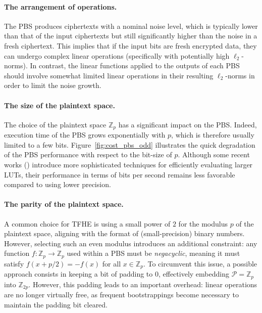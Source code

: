 \paragraph{The arrangement of operations.} The PBS produces ciphertexts with a nominal noise level, which is typically lower than that of the input ciphertexts but still significantly higher than the noise in a fresh ciphertext. This implies that if the input bits are fresh encrypted data, they can undergo complex linear operations (specifically with potentially high $\ell_2$-norms). In contrast, the linear functions applied to the outputs of each PBS should involve somewhat limited linear operations in their resulting  $\ell_2$-norms in order to limit the noise growth.

\paragraph{The size of the plaintext space.} The choice of the plaintext space $\mathbb{Z}_p$ has a significant impact on the PBS. Indeed, execution time of the PBS grows exponentially with $p$, which is therefore usually limited to a few bits.
\ifeprint Figure~\ref{fig:cost_pbs_odd} illustrates the quick degradation of the PBS performance with respect to the bit-size of $p$. \fi
Although some recent works (\cite{GBA21,AC:CLOT21,EPRINT:CZBSG22,KluSch24}) introduce more sophisticated techniques for efficiently evaluating larger LUTs, their performance in terms of bits per second remains less favorable compared to using lower precision. %

\paragraph{The parity of the plaintext space.} A common choice for TFHE is using a small power of $2$ for the modulus $p$ of the plaintext space, aligning with the format of (small-precision) binary numbers. However, selecting such an even modulus introduces an additional constraint: any function $f:\mathbb{Z}_p \to \mathbb{Z}_p$ used within a PBS must be \emph{negacyclic}, meaning it must satisfy $f(x + p/2) = - f(x)$ for all $x \in \mathbb{Z}_p$. To circumvent this issue, a possible approach consists in keeping a bit of padding to $0$, effectively embedding $\mathcal{P} = \mathbb{Z}_p$ into $\mathbb{Z}_{2p}$. However, this padding leads to an important overhead: linear operations are no longer virtually free, as frequent bootstrappings become necessary to maintain the padding bit cleared. 

